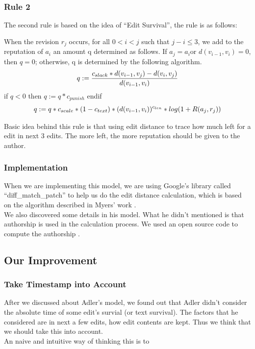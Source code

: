 \documentclass[preprint,review,12pt]{elsarticle}
\begin{document}
\subsubsection{Rule 2}
The second rule is based on the idea of ``Edit Survival'', the rule is as
follows:\\
\begin{ruullee}
  When the revision $r_j$ occurs, for all $0<i<j$ such that $j-i \leq 3$, we add
  to the reputation of $a_i$ an amount q determined as follows. If $a_j=a_i$or
  $d(v_{i-1}, v_i)=0$, then $q=0$; otherwise, q is determined by the following
  algorithm.
  \[
    \centering
    q := \frac{c_{slack}*d(v_{i-1},v_j) - d(v_i,v_j)}{d(v_{i-1},v_i)}
  \]
       if $q<0$ then $q:=q*c_{punish}$ endif
  \[
    \centering
    q := q*c_{scale}*(1-c_{text})*(d(v_{i-1}, v_i))^{c_{len}}*log(1+R(a_j,r_j))
  \]
\end{ruullee}
Basic idea behind this rule is that using edit distance to trace how much left
for a edit in next 3 edits. The more left, the more reputation should be given
to the author.

\subsubsection{Implementation}
When we are implementing this model, we are using Google's library called
``diff\_match\_patch'' to help us do the edit distance calculation, which is
based on the algorithm described in Myers' work \cite{myers1986ano}.\\
We also discovered some details in his model. What he didn't mentioned is that
authorship is used in the calculation process. We used an open source code to
compute the authorship \cite{de2013attributing}. 

\subsection{Our Improvement}
\subsubsection{Take Timestamp into Account}
After we discussed about Adler's model, we found out that Adler didn't consider
the absolute time of some edit's survial (or text survival). The factors that he
considered are in next a few edits, how edit contents are kept. Thus we think
that we should take this into account.\\
An naive and intuitive way of thinking this is to 
\end{document}
